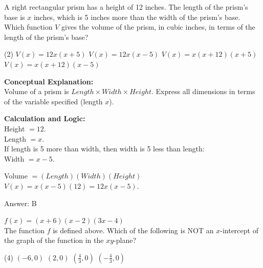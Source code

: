 \documentclass[11pt,paper=a4,answers]{exam}
\begin{document}
\begin{questions}
\vspace{40pt}

\question
A right rectangular prism has a height of 12 inches. The length of the prism's base is $x$ inches, which is 5 inches more than the width of the prism's base. Which function $V$ gives the volume of the prism, in cubic inches, in terms of the length of the prism's base?
\begin{tasks}(2)
    \task $V(x) = 12x(x+5)$
    \task $V(x) = 12x(x-5)$
    \task $V(x) = x(x+12)(x+5)$
    \task $V(x) = x(x+12)(x-5)$
\end{tasks}

\begin{solution}
\textbf{Conceptual Explanation:} \\
Volume of a prism is $Length \times Width \times Height$. Express all dimensions in terms of the variable specified (length $x$).

\vspace{20pt}

\textbf{Calculation and Logic:} \\
Height $= 12$. \\
Length $= x$. \\
If length is 5 more than width, then width is 5 less than length: \\
Width $= x - 5$.

\vspace{10pt}

Volume $= (Length)(Width)(Height)$ \\
$V(x) = x(x - 5)(12) = 12x(x - 5)$.

\vspace{25pt}

Answer: \colorbox{yellow!100}{B}
\end{solution}

\vspace{40pt}

\question
$f(x) = (x+6)(x-2)(3x-4)$ \\
The function $f$ is defined above. Which of the following is NOT an $x$-intercept of the graph of the function in the $xy$-plane?
\begin{tasks}(4)
    \task $(-6, 0)$
    \task $(2, 0)$
    \task $(\frac{4}{3}, 0)$
    \task $(-\frac{4}{3}, 0)$
\end{tasks}


\end{questions}
\end{document}
